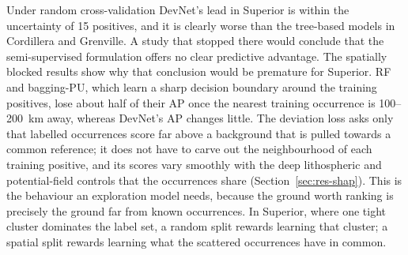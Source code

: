 \documentclass[pdflatex,sn-apa]{sn-jnl}
\begin{document}
Under random cross-validation DevNet's lead in Superior is within the uncertainty of 15 positives, and it is clearly worse than the tree-based models in Cordillera and Grenville. A study that stopped there would conclude that the semi-supervised formulation offers no clear predictive advantage. The spatially blocked results show why that conclusion would be premature for Superior. RF and bagging-PU, which learn a sharp decision boundary around the training positives, lose about half of their AP once the nearest training occurrence is 100--200~km away, whereas DevNet's AP changes little. The deviation loss asks only that labelled occurrences score far above a background that is pulled towards a common reference; it does not have to carve out the neighbourhood of each training positive, and its scores vary smoothly with the deep lithospheric and potential-field controls that the occurrences share (Section~\ref{sec:res-shap}). This is the behaviour an exploration model needs, because the ground worth ranking is precisely the ground far from known occurrences. In Superior, where one tight cluster dominates the label set, a random split rewards learning that cluster; a spatial split rewards learning what the scattered occurrences have in common.
\end{document}

